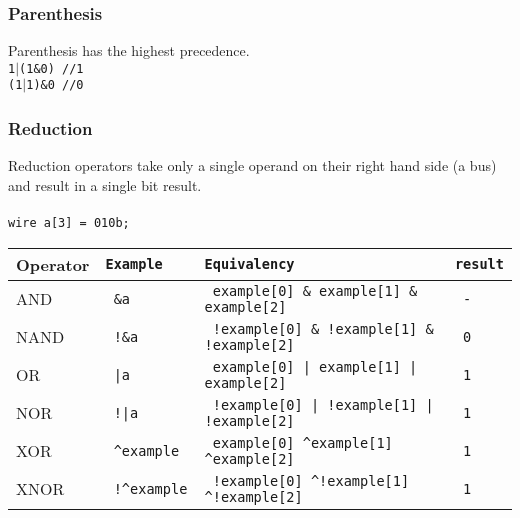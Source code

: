 \documentclass[letterpaper,11pt]{article}
\begin{document}
        \subsubsection{Parenthesis}
        Parenthesis has the highest precedence. \\
        \texttt{1$\mid$(1\&0) \slash\slash1} \\
        \texttt{(1$\mid$1)\&0 \slash\slash 0} \\
        
        \subsubsection{Reduction}
        Reduction operators take only a single operand on their right hand side (a bus) and result in a
        single bit result. \\\\
        \texttt{wire a[3] = 010b;} \\
        
        \begin{center} 
        \begin{tabular}{|l|>{\texttt\bgroup}l<{\egroup}|>{\texttt\bgroup}l<{\egroup}|>{\texttt\bgroup}l<{\egroup}|}
        \hline
        Operator&Example&Equivalency&result\\ \hline
        AND		&	\&a       	&	example[0] \& example[1] \& example[2]     &	-		\\ \hline
        NAND		&	!\&a      	&	!example[0] \& !example[1] \& !example[2]  &	0		\\ \hline
        OR		&	|a       	&	example[0] | example[1] | example[2]       &	1		\\ \hline
        NOR		&	!|a      	&	!example[0] | !example[1] | !example[2]    & 	1		\\ \hline
        XOR		&	\textasciicircum example 	&	example[0] \textasciicircum example[1] \textasciicircum example[2]       &	1		\\ \hline
        XNOR		&	!\textasciicircum example	&	!example[0] \textasciicircum !example[1] \textasciicircum !example[2]    & 	1		\\ \hline
        \end{tabular}
        \end{center}
        
\end{document}
